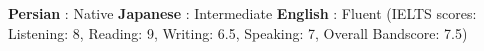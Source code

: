 \begin{cventries}
    \skillentry
    {
    \bullet  \space \textbf{Persian} : Native \newline \vspace{1 mm}
    \bullet \space \textbf{Japanese} : Intermediate  \newline \vspace{1 mm}
    \bullet \space \textbf{English} : Fluent (IELTS scores:\hspace{5 mm} Listening: 8,\hspace{5 mm} Reading: 9,\hspace{5 mm} Writing: 6.5,\hspace{5 mm} Speaking: 7,\hspace{5 mm} Overall Bandscore: 7.5) 
    }
\end{cventries}